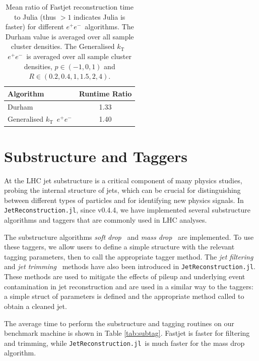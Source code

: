\documentclass{webofc}
\newcommand{\kt}{${k}_\text{T}$}
\newcommand{\JR}{\texttt{JetReconstruction.jl}}
\newcommand{\ee}{$e^+e^-$}
\begin{document}
\begin{table}[th]
    \begin{center}
        \begin{tabular}{l|c}
            \textbf{Algorithm} & \textbf{Runtime Ratio} \\
            \hline
            Durham & 1.33 \\
            Generalised \kt\ \ee & 1.40 \\
        \end{tabular}
        \caption{Mean ratio of Fastjet reconstruction time to Julia (thus $>1$ indicates Julia is faster) for different \ee\ algorithms. The Durham value is averaged over all sample cluster densities. The Generalised \kt\ \ee\ is averaged over all sample cluster densities, $p \in (-1, 0, 1)$ and $R \in (0.2, 0.4, 1, 1.5, 2, 4)$.}
        \label{tab:eeratios}
    \end{center}
\end{table}

\section{Substructure and Taggers}
\label{sec:sstag}

At the LHC jet substructure is a critical component of many physics studies,
probing the internal structure of jets, which can be crucial for distinguishing
between different types of particles and for identifying new physics signals. In
\JR, since v0.4.4, we have implemented several substructure algorithms and taggers that are
commonly used in LHC analyses.

The substructure algorithms \emph{soft
drop}~\cite{Larkoski_2014} and \emph{mass drop}~\cite{Butterworth_2008} are
implemented. To use these taggers, we allow users to define a simple structure
with the relevant tagging parameters, then to call the appropriate tagger
method. The \emph{jet filtering}~\cite{Butterworth_2008} and \emph{jet
trimming}~\cite{Krohn_2010} methods have also been introduced in \JR. These
methods are used to mitigate the effects of pileup and underlying event
contamination in jet reconstruction and are used in a similar way to the
taggers: a simple struct of parameters is defined and the appropriate method
called to obtain a cleaned jet.

The average time to perform the substructure and tagging routines on our
benchmark machine is shown in Table \ref{tab:subtag}. Fastjet is faster
for filtering and trimming, while \JR\ is much faster for the mass drop
algorithm.
\end{document}
